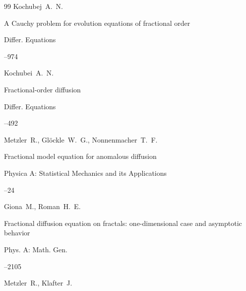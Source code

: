 \begin{thebibliography}{99}
\by Kochubej~A.~N.

\paper A Cauchy problem for evolution equations of fractional order

\jour Differ. Equations 



--974 






\by Kochubei~A.~N.

\paper Fractional-order diffusion

\jour Differ. Equations 



--492 





\by  Metzler~R., Gl\"ockle~W.~G., Nonnenmacher~T.~F.

\paper Fractional model equation for anomalous diffusion

\jour Physica A: Statistical Mechanics and its Applications 




--24







\by Giona~M., Roman~H.~E.

\paper Fractional diffusion equation on fractals: one-dimensional case and asymptotic behavior

\jour Phys. A: Math. Gen.




--2105





\by Metzler~R., Klafter~J.


\end{thebibliography}
